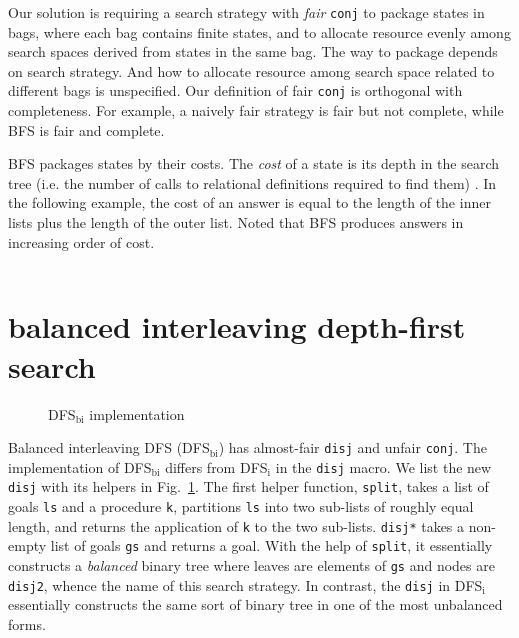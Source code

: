 \documentclass[format=acmlarge, review=true, authordraft=true]{acmart}
\newcommand{\conj}{\texttt{conj}}
\newcommand{\disj}{\texttt{disj}}
\begin{document}
Our solution is requiring a search strategy with \emph{fair} \conj{} to 
package states in bags, where each bag contains finite states, and to allocate 
resource evenly among search spaces derived from states in the same bag. The 
way to package depends on search strategy. And how to allocate resource among 
search space related to different bags is unspecified. Our definition of fair 
\conj{} is orthogonal with completeness. For example, a naively fair strategy 
is fair but not complete, while BFS is fair and complete. 

BFS packages states by their costs. The \emph{cost} of a state is its 
depth in the search tree (i.e. the number of calls to relational definitions 
required to find them) \citep{seres1999algebra}. In the following example, the 
cost of an answer is equal to the length of the inner lists plus the length of 
the outer list. Noted that BFS produces answers in increasing order of cost.

\begin{center}
	\begin{tabular}{c}
		
	\end{tabular}
\end{center}

\section{balanced interleaving depth-first search}

\begin{figure}
	
	\caption{DFS$_\textrm{bi}$ implementation}
	\label{balanced-disj}
\end{figure}

Balanced interleaving DFS (DFS$_\textrm{bi}$) has almost-fair \disj{} and unfair \conj{}. 
The implementation of DFS$_\textrm{bi}$ differs from DFS$_\textrm{i}$ in the \disj{} macro. We list the 
new \disj{} with its helpers in Fig.~\ref{balanced-disj}. The first helper 
function, \texttt{split}, takes a list of goals \texttt{ls} and a procedure 
\texttt{k}, partitions \texttt{ls} into two sub-lists of roughly equal length, 
and returns the application of \texttt{k} to the two sub-lists. \texttt{disj*} 
takes a non-empty list of goals \texttt{gs} and returns a goal. With the help 
of \texttt{split}, it essentially constructs a \emph{balanced} binary tree 
where leaves are elements of \texttt{gs} and nodes are \texttt{disj2}, whence 
the name of this search strategy. In contrast, the \disj{} in DFS$_\textrm{i}$ essentially 
constructs the same sort of binary tree in one of the most unbalanced forms.
\end{document}

